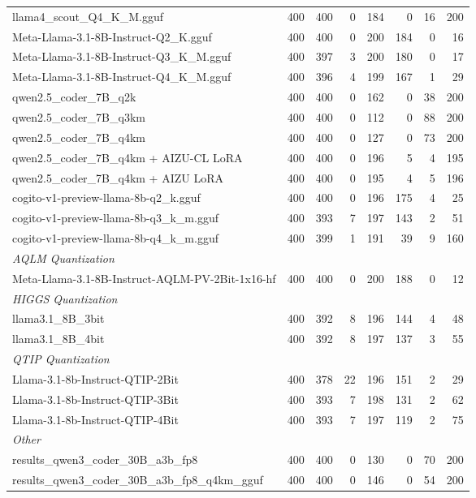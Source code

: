 \begin{table}[htbp]
{\begin{tabular}{lrrrrrrr}
    llama4\_scout\_Q4\_K\_M.gguf & 400 & 400 & 0 & 184 & 0 & 16 & 200 \\
    Meta-Llama-3.1-8B-Instruct-Q2\_K.gguf & 400 & 400 & 0 & 200 & 184 & 0 & 16 \\
    Meta-Llama-3.1-8B-Instruct-Q3\_K\_M.gguf & 400 & 397 & 3 & 200 & 180 & 0 & 17 \\
    Meta-Llama-3.1-8B-Instruct-Q4\_K\_M.gguf & 400 & 396 & 4 & 199 & 167 & 1 & 29 \\
    qwen2.5\_coder\_7B\_q2k & 400 & 400 & 0 & 162 & 0 & 38 & 200 \\
    qwen2.5\_coder\_7B\_q3km & 400 & 400 & 0 & 112 & 0 & 88 & 200 \\
    qwen2.5\_coder\_7B\_q4km & 400 & 400 & 0 & 127 & 0 & 73 & 200 \\
    qwen2.5\_coder\_7B\_q4km + AIZU-CL LoRA & 400 & 400 & 0 & 196 & 5 & 4 & 195 \\
    qwen2.5\_coder\_7B\_q4km + AIZU LoRA & 400 & 400 & 0 & 195 & 4 & 5 & 196 \\
    cogito-v1-preview-llama-8b-q2\_k.gguf & 400 & 400 & 0 & 196 & 175 & 4 & 25 \\
    cogito-v1-preview-llama-8b-q3\_k\_m.gguf & 400 & 393 & 7 & 197 & 143 & 2 & 51 \\
    cogito-v1-preview-llama-8b-q4\_k\_m.gguf & 400 & 399 & 1 & 191 & 39 & 9 & 160 \\
    \midrule
    \multicolumn{8}{l}{\textit{AQLM Quantization}} \\
    \midrule
    Meta-Llama-3.1-8B-Instruct-AQLM-PV-2Bit-1x16-hf & 400 & 400 & 0 & 200 & 188 & 0 & 12 \\
    \midrule
    \multicolumn{8}{l}{\textit{HIGGS Quantization}} \\
    \midrule
    llama3.1\_8B\_3bit & 400 & 392 & 8 & 196 & 144 & 4 & 48 \\
    llama3.1\_8B\_4bit & 400 & 392 & 8 & 197 & 137 & 3 & 55 \\
    \midrule
    \multicolumn{8}{l}{\textit{QTIP Quantization}} \\
    \midrule
    Llama-3.1-8b-Instruct-QTIP-2Bit & 400 & 378 & 22 & 196 & 151 & 2 & 29 \\
    Llama-3.1-8b-Instruct-QTIP-3Bit & 400 & 393 & 7 & 198 & 131 & 2 & 62 \\
    Llama-3.1-8b-Instruct-QTIP-4Bit & 400 & 393 & 7 & 197 & 119 & 2 & 75 \\
    \midrule
    \multicolumn{8}{l}{\textit{Other}} \\
    \midrule
    results\_qwen3\_coder\_30B\_a3b\_fp8 & 400 & 400 & 0 & 130 & 0 & 70 & 200 \\
    results\_qwen3\_coder\_30B\_a3b\_fp8\_q4km\_gguf & 400 & 400 & 0 & 146 & 0 & 54 & 200 \\
    \bottomrule
  \end{tabular}
  }
\end{table}


